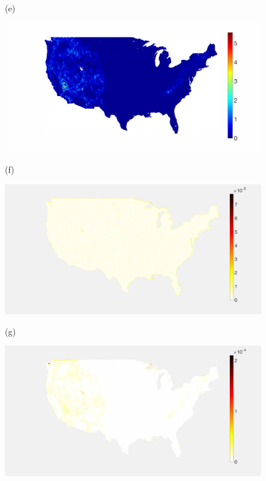 \documentclass[journal, 10pt]{IEEEtran}
\begin{document}
\begin{figure}[tb]
\begin{minipage}[m]{0.24\linewidth}
\centerline{\small{(e)}}
\end{minipage}
\begin{minipage}[m]{0.24\linewidth}
\centerline{\includegraphics[width=1\linewidth]{fig_temp_band2_coeffs}}
\centerline{\small{(f)}}
\end{minipage} %
\begin{minipage}[m]{0.24\linewidth}
\centerline{\includegraphics[width=.95\linewidth]{fig_temp_sampling2}}
\centerline{\small{(g)}}
\end{minipage}
\begin{minipage}[m]{0.24\linewidth}
\centerline{\includegraphics[width=.94\linewidth]{fig_temp_sampling2_adapted}}

\end{minipage}
\end{figure}
\end{document}
